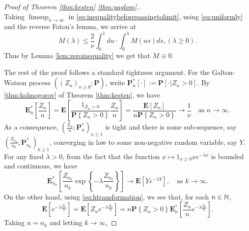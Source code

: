 \documentclass[12pt]{amsart}
\theoremstyle{remark}
\numberwithin{equation}{section}
\newcommand{\prob}{\mathbf P}
\newcommand{\brac}[1]{\left[ #1 \right]}
\newcommand{\set}[1]{\left\{ #1 \right\}}
\newcommand{\expct}{\mathbf E}
\begin{document}
\begin{proof}[Proof of   Theorem \ref{thm:kesten} \eqref{thm:yaglom}.]
\begin{equation}
\end{equation}
    Taking $\limsup_{n\to\infty}$ in
    \eqref{eq:inequalitybeforepassingtolimit}, using \eqref{eq:uniformly} and 
the reverse Fatou's lemma, we arrive at
\begin{equation*}
	    M(\lambda)
    \leq
        \frac{2}{\nu}\int_0^1du
    \cdot
        \int_0^\lambda M(us)ds
    ,(\lambda\geq 0).
\end{equation*}
Thus by Lemma \ref{lem:zeroinequality} we get that $M\equiv 0$.
\par
	The rest of the proof follows a standard tightness argument. 
For the Galton-Watson process $((Z_n)_{n\ge 0};\prob)$, 
	write $\prob_n^*[\cdot]:=\prob[\cdot|Z_n>0]$. 
By \eqref{thm:kolmogorov} of Theorem \ref{thm:kesten}, 
we have
\begin{equation*}
	    \expct_n^*\brac{\frac{Z_n}{n}}
	=
	    \expct\brac{\frac{1_{Z_n>0}}{\prob\set{Z_n>0}}\frac{Z_n}{n}}
	=
	    \frac{\expct\brac{Z_n}}{n\prob\set{Z_n>0}}
    \to
        \frac{1}{\nu}
   \quad\mbox{as }n\to\infty.
\end{equation*}
	As a consequence, 
$(\frac{Z_n}{n};\prob_n^*)_{n\ge 1}$ is tight and 
there is some sub-sequence, say 
$(\frac{Z_{n_k}}{n_k};\prob_{n_k}^*)_{k\ge 1}$, converging in law to some non-negative random variable, say $Y$. For any fixed $\lambda >0$, from the fact that the function $x\mapsto 1_{x\geq 0}xe^{-\lambda x}$ is bounded and continuous, we have
\begin{equation}
\label{eq:subsequence}
	    \expct_{n_k}^*\brac{\frac{Z_{n_k}}{n_k}\exp\set{-\lambda\frac{Z_{n_k}}{n_k}}}
	\to
	    \expct\brac{Ye^{-\lambda Y}},
\quad\mbox{as }k\to\infty.
\end{equation}
	On the other hand, using \eqref{eq:htransformation}, 
we see that,
for each $n\in\mathbb N$,
\begin{equation}
\label{eq:sizebiasedandcondition}
	    \expct\brac{e^{-\lambda\frac{\dot Z_n}{n}}}
	=
	    \expct\brac{Z_n e^{-\lambda\frac{Z_n}{n}}}
	=
	    n\prob\set{Z_n>0}\expct_n^*\brac{\frac{Z_n}{n}e^{-\lambda\frac{Z_n}{n}}}.
\end{equation}
	Taking $n=n_k$ and
letting $k\to\infty$,

\end{proof}
\end{document}
